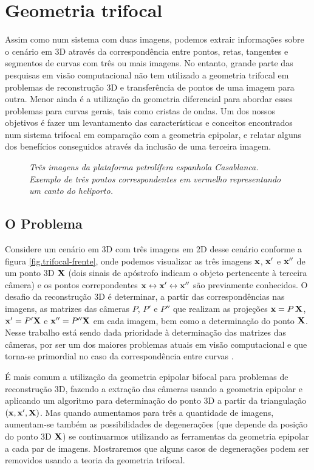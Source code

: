\newpage
\section{Geometria trifocal}\label{sec.geo-tri}
Assim como num sistema com duas imagens, podemos extrair informações sobre o cenário em 3D através da correspondência entre pontos, retas, tangentes e segmentos de curvas com três  ou mais imagens. No entanto, grande parte das pesquisas em visão computacional não tem utilizado a geometria trifocal em problemas de reconstrução 3D e transferência de pontos de uma imagem para outra. Menor ainda é a utilização da geometria diferencial para abordar esses problemas para curvas gerais, tais como cristas de ondas. Um dos nossos objetivos é fazer um levantamento das características e conceitos encontrados num sistema trifocal em comparação com a geometria epipolar, e relatar alguns dos benefícios conseguidos através da inclusão de uma terceira imagem.

\begin{figure}[htb!]
\centering
{}
\quad
{}
\quad
{}
\caption{{\it Três imagens da plataforma petrolífera espanhola Casablanca. Exemplo de três pontos correspondentes em vermelho representando um canto do heliporto.}}
\end{figure}

\subsection{O Problema}
Considere um cenário em 3D com três imagens em 2D desse cenário conforme a figura \ref{fig.trifocal-frente}, onde podemos visualizar as três imagens $\mathbf{x}$, $\mathbf{x}'$ e $\mathbf{x}''$ de um ponto 3D $\mathbf{X}$ (dois sinais de apóstrofo indicam o objeto pertencente à terceira câmera) e os pontos correpondentes $\mathbf{x}\leftrightarrow\mathbf{x}'\leftrightarrow\mathbf{x}''$ são previamente conhecidos. O desafio da reconstrução 3D é determinar, a partir das correspondências nas imagens, as matrizes das câmeras $P$, $P'$ e $P''$ que realizam as projeções $\mathbf{x}=P\,\mathbf{X}$, $\mathbf{x}'=P'\mathbf{X}$ e $\mathbf{x}''=P''\mathbf{X}$ em cada imagem, bem como a determinação do ponto $\mathbf{X}$. Nesse trabalho está sendo dada prioridade à determinação das matrizes das câmeras, por ser um dos maiores problemas atuais em visão computacional e que torna-se primordial no caso da correspond\^encia entre curvas \citep{tese-fabbri}.

É mais comum a utilização da geometria epipolar bifocal para problemas de reconstrução 3D, fazendo a extração das câmeras usando a geometria epipolar e aplicando um algoritmo para determinação do ponto 3D a partir da triangulação $(\mathbf{x},\mathbf{x}',\mathbf{X})$. Mas quando aumentamos para três a quantidade de imagens, aumentam-se também as possibilidades de degenerações (que depende  da posição do ponto 3D $\mathbf{X}$) se continuarmos utilizando as ferramentas da geometria epipolar a cada par de imagens. Mostraremos que alguns casos de degenerações podem ser removidos usando a teoria da geometria trifocal.


